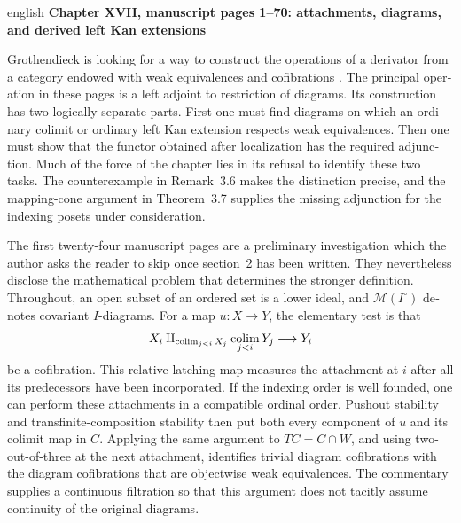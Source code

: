 \begin{otherlanguage}{english}
\begin{otherlanguage*}{english}
\noindent\textbf{Chapter XVII, manuscript pages 1--70: attachments, diagrams, and derived left Kan extensions}



\medskip
Grothendieck is looking for a way to construct the operations of a derivator from a category endowed with weak equivalences and cofibrations \citep{Grothendieck1990XVII}. The principal operation in these pages is a left adjoint to restriction of diagrams. Its construction has two logically separate parts. First one must find diagrams on which an ordinary colimit or ordinary left Kan extension respects weak equivalences. Then one must show that the functor obtained after localization has the required adjunction. Much of the force of the chapter lies in its refusal to identify these two tasks. The counterexample in Remark~3.6 makes the distinction precise, and the mapping-cone argument in Theorem~3.7 supplies the missing adjunction for the indexing posets under consideration.

The first twenty-four manuscript pages are a preliminary investigation which the author asks the reader to skip once section~2 has been written. They nevertheless disclose the mathematical problem that determines the stronger definition. Throughout, an open subset of an ordered set is a lower ideal, and $\mathcal M(I^\circ)$ denotes covariant $I$-diagrams. For a map $u:X\to Y$, the elementary test is that
\[
 X_i\amalg_{\mathop{\rm colim}_{j<i}X_j}
       \mathop{\rm colim}_{j<i}Y_j\longrightarrow Y_i
\]
be a cofibration. This relative latching map measures the attachment at $i$ after all its predecessors have been incorporated. If the indexing order is well founded, one can perform these attachments in a compatible ordinal order. Pushout stability and transfinite-composition stability then put both every component of $u$ and its colimit map in $C$. Applying the same argument to $TC=C\cap W$, and using two-out-of-three at the next attachment, identifies trivial diagram cofibrations with the diagram cofibrations that are objectwise weak equivalences. The commentary supplies a continuous filtration so that this argument does not tacitly assume continuity of the original diagrams.


\end{otherlanguage*}
\end{otherlanguage}

